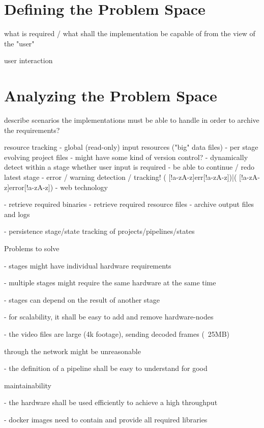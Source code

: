 \section{Defining the Problem Space}

what is required / what shall the implementation be capable of from the view of the "user"

user interaction



\section{Analyzing the Problem Space}

describe scenarios the implementations must be able to handle in order to archive the requirements?

resource tracking
 - global (read-only) input resources ("big" data files)
 - per stage evolving project files
   - might have some kind of version control?
 - dynamically detect within a stage whether user input is required
 - be able to continue / redo latest stage
 - error / warning detection / tracking!
   ( [!a-zA-z]err[!a-zA-z])|( [!a-zA-z]error[!a-zA-z])
 - web technology

- retrieve required binaries
- retrieve required resource files
- archive output files and logs

- persistence stage/state tracking of projects/pipelines/states

Problems to solve



- stages might have individual hardware requirements

- multiple stages might require the same hardware at the same time

- stages can depend on the result of another stage

- for scalability, it shall be easy to add and remove hardware-nodes

- the video files are large (4k footage), sending decoded frames (~25MB)

through the network might be unreasonable

- the definition of a pipeline shall be easy to understand for good

maintainability

- the hardware shall be used efficiently to achieve a high throughput

- docker images need to contain and provide all required libraries

